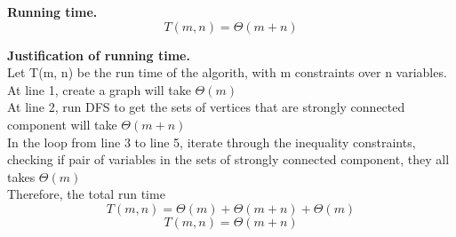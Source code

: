 \documentclass[11pt]{article}
\begin{document}
\noindent
\textbf{Running time.}
$$\boxed{T(m,n) = \Theta(m + n)}$$


\noindent
\Large{}
\textbf{Justification of running time.}\\
Let T(m, n) be the run time of the algorith, with m constraints over n variables.\\
At line 1, create a graph will take $\Theta(m)$\\
At line 2, run DFS to get the sets of vertices that are strongly connected component will take $\Theta(m + n)$\\
In the loop from line 3 to line 5, iterate through the inequality constraints, checking if pair of variables in the sets of strongly connected component, they all takes $\Theta(m)$\\
Therefore, the total run time\\
$$T(m,n) = \Theta(m) + \Theta(m + n) + \Theta(m)$$
$$\boxed{T(m,n) = \Theta(m + n)}$$

\newpage
\end{document}
